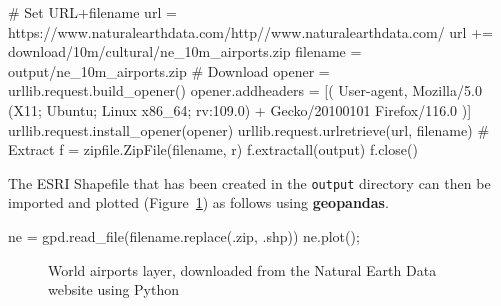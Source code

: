 \documentclass[
  letterpaper,
]{krantz}
\newenvironment{Shaded}{\begin{snugshade}}{\end{snugshade}}
\newcommand{\CommentTok}[1]{\textcolor[rgb]{0.37,0.37,0.37}{#1}}
\newcommand{\NormalTok}[1]{\textcolor[rgb]{0.00,0.23,0.31}{#1}}
\newcommand{\OperatorTok}[1]{\textcolor[rgb]{0.37,0.37,0.37}{#1}}
\newcommand{\StringTok}[1]{\textcolor[rgb]{0.13,0.47,0.30}{#1}}
\begin{document}
\begin{Shaded}
\begin{Highlighting}[]
\CommentTok{\# Set URL+filename}
\NormalTok{url }\OperatorTok{=} \StringTok{\textquotesingle{}https://www.naturalearthdata.com/http//www.naturalearthdata.com/\textquotesingle{}}
\NormalTok{url }\OperatorTok{+=} \StringTok{\textquotesingle{}download/10m/cultural/ne\_10m\_airports.zip\textquotesingle{}}
\NormalTok{filename }\OperatorTok{=} \StringTok{\textquotesingle{}output/ne\_10m\_airports.zip\textquotesingle{}}
\CommentTok{\# Download}
\NormalTok{opener }\OperatorTok{=}\NormalTok{ urllib.request.build\_opener()}
\NormalTok{opener.addheaders }\OperatorTok{=}\NormalTok{ [(}
    \StringTok{\textquotesingle{}User{-}agent\textquotesingle{}}\NormalTok{, }
    \StringTok{\textquotesingle{}Mozilla/5.0 (X11; Ubuntu; Linux x86\_64; rv:109.0) \textquotesingle{}} \OperatorTok{+}
      \StringTok{\textquotesingle{}Gecko/20100101 Firefox/116.0\textquotesingle{}}
\NormalTok{)]}
\NormalTok{urllib.request.install\_opener(opener)}
\NormalTok{urllib.request.urlretrieve(url, filename)}
\CommentTok{\# Extract}
\NormalTok{f }\OperatorTok{=}\NormalTok{ zipfile.ZipFile(filename, }\StringTok{\textquotesingle{}r\textquotesingle{}}\NormalTok{)}
\NormalTok{f.extractall(}\StringTok{\textquotesingle{}output\textquotesingle{}}\NormalTok{)}
\NormalTok{f.close()}
\end{Highlighting}
\end{Shaded}

The ESRI Shapefile that has been created in the \texttt{output}
directory can then be imported and plotted
(Figure~\ref{fig-ne-airports}) as follows using \textbf{geopandas}.

\begin{Shaded}
\begin{Highlighting}[]
\NormalTok{ne }\OperatorTok{=}\NormalTok{ gpd.read\_file(filename.replace(}\StringTok{\textquotesingle{}.zip\textquotesingle{}}\NormalTok{, }\StringTok{\textquotesingle{}.shp\textquotesingle{}}\NormalTok{))}
\NormalTok{ne.plot()}\OperatorTok{;}
\end{Highlighting}
\end{Shaded}

\begin{figure}[H]


\caption{\label{fig-ne-airports}World airports layer, downloaded from
the Natural Earth Data website using Python}

\end{figure}%
\end{document}
